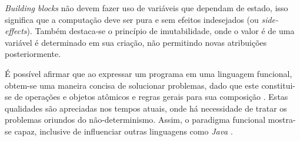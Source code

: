 \documentclass[10pt, conference]{IEEEtran}
\begin{document}
\textit{Building blocks} não devem fazer uso de variáveis que dependam de estado, isso significa que a computação deve ser pura e sem efeitos indesejados (ou \textit{side-effects}). Também destaca-se o princípio de imutabilidade, onde o valor é de uma variável é determinado em sua criação, não permitindo novas atribuições posteriormente.

É possível afirmar que ao expressar um programa em uma linguagem funcional, obtem-se uma maneira concisa de solucionar problemas, dado que este constitui-se de operações e objetos atômicos e regras gerais para sua composição \cite{michaelson2011introduction}. Estas qualidades são apreciadas nos tempos atuais, onde há necessidade de tratar os problemas oriundos do não-determinismo. Assim, o paradigma funcional mostra-se capaz, inclusive de influenciar outras linguagens como \textit{Java} \cite{jsr335}.



\end{document}
